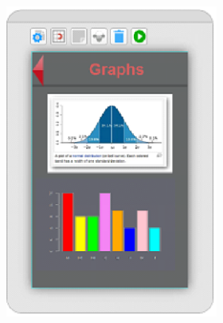\documentclass{article}
\begin{document}
\noindent \includegraphics*[width=2.75in, height=4.09in, keepaspectratio=false]{image23}  
\end{document}
